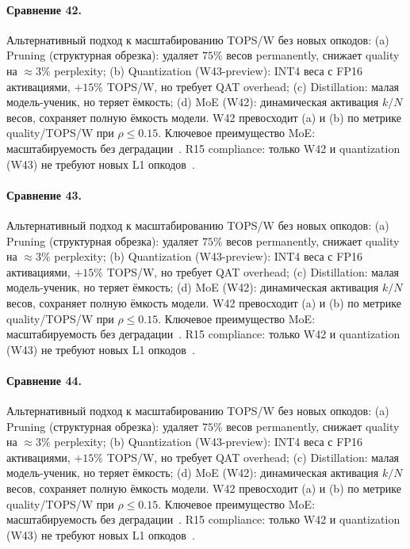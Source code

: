 \paragraph{Сравнение 42.} Альтернативный подход к масштабированию TOPS/W без новых опкодов: (a) Pruning (структурная обрезка): удаляет $75\%$ весов permanently, снижает quality на $\approx 3\%$ perplexity; (b) Quantization (W43-preview): INT4 веса с FP16 активациями, $+15\%$ TOPS/W, но требует QAT overhead; (c) Distillation: малая модель-ученик, но теряет ёмкость; (d) MoE (W42): динамическая активация $k/N$ весов, сохраняет полную ёмкость модели. W42 превосходит (a) и (b) по метрике quality/TOPS/W при $\rho \leq 0{.}15$. Ключевое преимущество MoE: масштабируемость без деградации~\cite{switch_transformer2021,mixtral2024}. R15 compliance: только W42 и quantization (W43) не требуют новых L1 опкодов~\cite{lee_gvsu_proof2021}.

\paragraph{Сравнение 43.} Альтернативный подход к масштабированию TOPS/W без новых опкодов: (a) Pruning (структурная обрезка): удаляет $75\%$ весов permanently, снижает quality на $\approx 3\%$ perplexity; (b) Quantization (W43-preview): INT4 веса с FP16 активациями, $+15\%$ TOPS/W, но требует QAT overhead; (c) Distillation: малая модель-ученик, но теряет ёмкость; (d) MoE (W42): динамическая активация $k/N$ весов, сохраняет полную ёмкость модели. W42 превосходит (a) и (b) по метрике quality/TOPS/W при $\rho \leq 0{.}15$. Ключевое преимущество MoE: масштабируемость без деградации~\cite{switch_transformer2021,mixtral2024}. R15 compliance: только W42 и quantization (W43) не требуют новых L1 опкодов~\cite{lee_gvsu_proof2021}.

\paragraph{Сравнение 44.} Альтернативный подход к масштабированию TOPS/W без новых опкодов: (a) Pruning (структурная обрезка): удаляет $75\%$ весов permanently, снижает quality на $\approx 3\%$ perplexity; (b) Quantization (W43-preview): INT4 веса с FP16 активациями, $+15\%$ TOPS/W, но требует QAT overhead; (c) Distillation: малая модель-ученик, но теряет ёмкость; (d) MoE (W42): динамическая активация $k/N$ весов, сохраняет полную ёмкость модели. W42 превосходит (a) и (b) по метрике quality/TOPS/W при $\rho \leq 0{.}15$. Ключевое преимущество MoE: масштабируемость без деградации~\cite{switch_transformer2021,mixtral2024}. R15 compliance: только W42 и quantization (W43) не требуют новых L1 опкодов~\cite{lee_gvsu_proof2021}.

